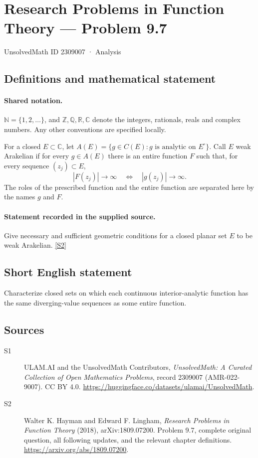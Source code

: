 \documentclass[11pt]{book}
\newcommand{\sref}[2]{\hyperlink{source:#1:#2}{[S#2]}}
\begin{document}
\setcounter{section}{2309006}
\section{Research Problems in Function Theory — Problem 9.7}\label{2309007}
{\small\sffamily UnsolvedMath ID 2309007 · Analysis}
\subsection{Definitions and mathematical statement}

\paragraph{Shared notation.}$\mathbb N=\{1,2,\ldots\}$, and $\mathbb Z,\mathbb Q,\mathbb R,\mathbb C$ denote the integers, rationals, reals and complex numbers. Any other conventions are specified locally.


For a closed $E\subset\mathbb C$, let $A(E)=\{g\in C(E):g\text{ is analytic on }E^{\circ}\}$. Call $E$ weak Arakelian if for every $g\in A(E)$ there is an entire function $F$ such that, for every sequence $(z_j)\subset E$, \[|F(z_j)|\to\infty\quad\Longleftrightarrow\quad |g(z_j)|\to\infty.\] The roles of the prescribed function and the entire function are separated here by the names $g$ and $F$.
\paragraph{Statement recorded in the supplied source.}
Give necessary and sufficient geometric conditions for a closed planar set $E$ to be weak Arakelian. \sref{2309007}{2}
\subsection{Short English statement}
Characterize closed sets on which each continuous interior-analytic function has the same diverging-value sequences as some entire function.
\subsection{Sources}
\begin{description}
\item[\hypertarget{source:2309007:1}{S1}] ULAM.AI and the UnsolvedMath Contributors, \emph{UnsolvedMath: A Curated Collection of Open Mathematics Problems}, record 2309007 (AMR-022-9007). CC BY 4.0. \url{https://huggingface.co/datasets/ulamai/UnsolvedMath}.
\item[\hypertarget{source:2309007:2}{S2}] Walter K. Hayman and Edward F. Lingham, \emph{Research Problems in Function Theory} (2018), arXiv:1809.07200. Problem 9.7, complete original question, all following updates, and the relevant chapter definitions. \url{https://arxiv.org/abs/1809.07200}.
\end{description}
\label{end:2309007}
\end{document}
